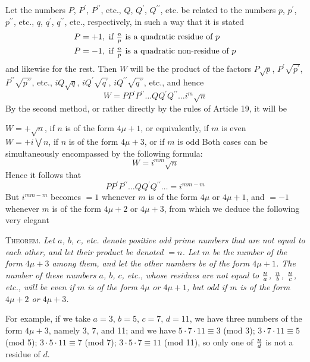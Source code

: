 \documentclass[twoside,12pt, showframe]{memoir}
\renewenvironment{quote}%
  {\list{}{\leftmargin=5em\rightmargin=0em}\item[]}%
  {\endlist}
\let\oldfrac\frac
\def\frac#1#2{\mathchoice{\tfrac{#1}{#2}}{\oldfrac{#1}{#2}}{\genfrac{}{}{}{2}{#1}{#2\mathstrut}}{\genfrac{}{}{}{3}{#1}{#2\mathstrut}}}
\begin{document}
Let the numbers \(P\), \(P^{\prime}\), \(P^{\prime\prime}\), etc., \(Q\), \(Q^{\prime}\), \(Q^{\prime\prime}\), etc. be related to the numbers \(p\), \(p^{\prime}\), \(p^{\prime\prime}\), etc., \(q\), \(q^{\prime}\), \(q^{\prime\prime}\), etc., respectively, in such a way that it is stated
\[\begin{aligned}
& P=+1, \text{ if } \frac{n}{p} \text{ is a quadratic residue of } p \\
& P=-1, \text{ if } \frac{n}{p} \text{ is a quadratic non-residue of } p
\end{aligned}\]
and likewise for the rest. Then \(W\) will be the product of the factors \(P \sqrt{p}\), \(P^{\prime} \sqrt{p^{\prime}}\), \(P^{\prime\prime} \sqrt{p^{\prime\prime}}\), etc., \(iQ \sqrt{q}\), \(iQ^{\prime} \sqrt{q^{\prime}}\), \(iQ^{\prime\prime} \sqrt{q^{\prime\prime}}\), etc., and hence
\[W=P P^{\prime} P^{\prime\prime} \ldots Q Q^{\prime} Q^{\prime\prime} \ldots i^{m} \sqrt{n}\]
By the second method, or rather directly by the rules of Article 19, it will be
\begin{quote}\(W=+\sqrt{n}\), if \(n\) is of the form \(4\mu+1\), or equivalently, if \(m\) is even\\
\(W=+i \bigvee n\), if \(n\) is of the form \(4\mu+3\), or if \(m\) is odd\end{quote}
Both cases can be simultaneously encompassed by the following formula:
\[W=i^{m m} \sqrt{n}\]
Hence it follows that
\[P P^{\prime} P^{\prime\prime} \ldots Q Q^{\prime} Q^{\prime\prime} \ldots=i^{m m-m}\]
But \(i^{m m-m}\) becomes \(=1\) whenever \(m\) is of the form \(4\mu\) or \(4\mu+1\), and \(=-1\) whenever \(m\) is of the form \(4\mu+2\) or \(4\mu+3\), from which we deduce the following very elegant
%

\textsc{Theorem.} \textit{Let \(a\), \(b\), \(c\), etc. denote positive odd prime numbers that are not equal to each other, and let their product be denoted \(=n\). Let \(m\) be the number of the form \(4\mu + 3\) among them, and let the other numbers be of the form \(4\mu + 1\). The number of these numbers \(a\), \(b\), \(c\), etc., whose residues are not equal to \(\frac{n}{a}\), \(\frac{n}{b}\), \(\frac{n}{c}\), etc., will be even if \(m\) is of the form \(4\mu\) or \(4\mu + 1\), but odd if \(m\) is of the form \(4\mu + 2\) or \(4\mu + 3\).}
 
For example, if we take \(a=3\), \(b=5\), \(c=7\), \(d=11\), we have three numbers of the form \(4\mu + 3\), namely 3, 7, and 11; and we have \(5 \cdot 7 \cdot 11 \equiv 3\) (mod 3); \(3 \cdot 7 \cdot 11 \equiv 5\) (mod 5); \(3 \cdot 5 \cdot 11 \equiv 7\) (mod 7); \(3 \cdot 5 \cdot 7 \equiv 11\) (mod 11), so only one of \(\frac{n}{d}\) is not a residue of \(d\).
%
\end{document}
